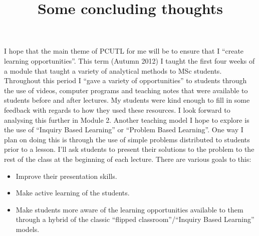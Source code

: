 \documentclass[12pt]{article}
\title{Some concluding thoughts}
\date{}
\begin{document}
\maketitle

I hope that the main theme of PCUTL for me will be to ensure that I ``create learning opportunities''. This term (Autumn 2012) I taught the first four weeks of a module that taught a variety of analytical methods to MSc students. Throughout this period I ``gave a variety of opportunities'' to students through the use of videos, computer programs and teaching notes that were available to students before and after lectures. My students were kind enough to fill in some feedback with regards to how they used these resources. I look forward to analysing this further in Module 2. Another teaching model I hope to explore is the use of ``Inquiry Based Learning'' or ``Problem Based Learning''. One way I plan on doing this is through the use of simple problems distributed to students prior to a lesson. I'll ask students to present their solutions to the problem to the rest of the class at the beginning of each lecture. There are various goals to this:

\begin{itemize}
\item Improve their presentation skills.
\item Make active learning of the students.
\item Make students more aware of the learning opportunities available to them through a hybrid of the classic ``flipped classroom''/``Inquiry Based Learning'' models.
\end{itemize}
\end{document}

